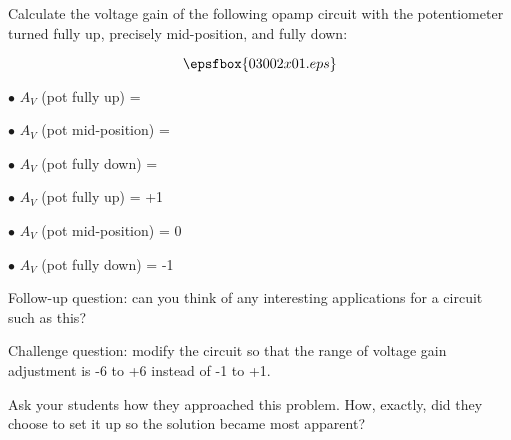 

Calculate the voltage gain of the following opamp circuit with the potentiometer turned fully up, precisely mid-position, and fully down:

$$\epsfbox{03002x01.eps}$$

\medskip
\goodbreak
\item{$\bullet$} $A_V$ (pot fully up) = 
\item{$\bullet$} $A_V$ (pot mid-position) = 
\item{$\bullet$} $A_V$ (pot fully down) = 
\medskip







\medskip
\item{$\bullet$} $A_V$ (pot fully up) = +1
\item{$\bullet$} $A_V$ (pot mid-position) = 0
\item{$\bullet$} $A_V$ (pot fully down) = -1
\medskip

\vskip 10pt

Follow-up question: can you think of any interesting applications for a circuit such as this?

\vskip 10pt

Challenge question: modify the circuit so that the range of voltage gain adjustment is -6 to +6 instead of -1 to +1.







Ask your students how they approached this problem.  How, exactly, did they choose to set it up so the solution became most apparent?





